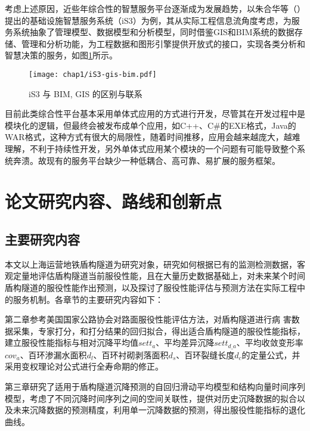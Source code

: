 考虑上述原因，近些年综合性的智慧服务平台逐渐成为发展趋势，以朱合华等（\citeyear{朱合华2018智慧基础设施}）提出的基础设施智慧服务系统（iS3）为例，其从实际工程信息流角度考虑，为服务系统抽象了管理模型、数据模型和分析模型，同时借鉴GIS和BIM系统的数据存储、管理和分析功能，为工程数据和图形引擎提供开放式的接口，实现各类分析和智慧决策的服务，如图\ref{fig:iS3-gis-bim}所示。

\begin{figure}[!h]
	\centering
	\texttt{[image: chap1/iS3-gis-bim.pdf]}
	\caption{iS3 与 BIM, GIS 的区别与联系}
	\label{fig:iS3-gis-bim}
\end{figure}

目前此类综合性平台基本采用单体式应用的方式进行开发，尽管其在开发过程中是模块化的逻辑，但最终会被发布成单个应用，如C++、C\#的EXE格式，Java的WAR格式，这种方式有很大的局限性，随着时间推移，应用会越来越庞大，越难理解，不利于持续性开发，另外单体式应用某个模块的一个问题有可能导致整个系统奔溃。故现有的服务平台缺少一种低耦合、高可靠、易扩展的服务框架。

\section{论文研究内容、路线和创新点}

\subsection{主要研究内容}

本文以上海运营地铁盾构隧道为研究对象，研究如何根据已有的监测检测数据，客观定量地评估盾构隧道当前服役性能，且在大量历史数据基础上，对未来某个时间盾构隧道的服役性能作出预测，以及探讨了服役性能评估与预测方法在实际工程中的服务机制。各章节的主要研究内容如下：

第二章参考美国国家公路协会对路面服役性能评估方法，对盾构隧道进行病
害数据采集，专家打分，和打分结果的回归拟合，得出适合盾构隧道的服役性能指标，建立服役性能指标与相对沉降平均值${sett}_{a}$、平均差异沉降$set{{t}_{d\_a}}$、平均收敛变形率${cov}_{a}$、百环渗漏水面积${d}_{l}$、百环衬砌剥落面积${d}_{s}$、百环裂缝长度${d}_{c}$的定量公式，并采用变权理论对公式进行全寿命期的修正。

第三章研究了适用于盾构隧道沉降预测的自回归滑动平均模型和结构向量时间序列模型，考虑了不同沉降时间序列之间的空间关联性，提供对历史沉降数据的拟合以及未来沉降数据的预测精度，利用单一沉降数据的预测，得出服役性能指标的退化曲线。

